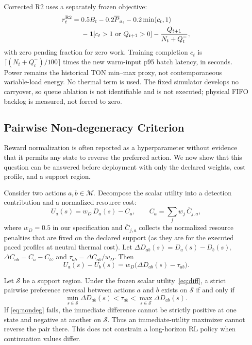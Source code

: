 Corrected R2 uses a separately frozen objective:
\begin{align}\label{eq:r2reward}
r_t^{\rm R2}={}&0.5 B_t-0.2\overline P_{a_t}-0.2\min(c_t,1)\nonumber\\
&-\ind[c_t>1\ \mathrm{or}\ Q_{t+1}>0]-\frac{Q_{t+1}}{N_t+Q_t^-},
\end{align}
with zero pending fraction for zero work. Training completion $c_t$ is $\lceil(N_t+Q_t^-)/100\rceil$ times the new warm-input p95 batch latency, in seconds. Power remains the historical TON min--max proxy, not contemporaneous variable-load energy. No thermal term is used. The fixed simulator develops no carryover, so queue ablation is not identifiable and is not executed; physical FIFO backlog is measured, not forced to zero.

\subsection{Pairwise Non-degeneracy Criterion}
Reward normalization is often reported as a hyperparameter without evidence that it permits any state to reverse the preferred action. We now show that this question can be answered before deployment with only the declared weights, cost profile, and a support region.

Consider two actions $a,b\in\mathcal M$. Decompose the scalar utility into a detection contribution and a normalized resource cost:
\begin{equation}
    U_a(s) = w_D\, D_a(s) - C_a,\qquad C_a=\sum_j w_j\,\overline C_{j,a},
\end{equation}
where $w_D=0.5$ in our specification and $\overline C_{j,a}$ collects the normalized resource penalties that are fixed on the declared support (as they are for the executed paced profiles at neutral thermal cost). Let $\Delta D_{ab}(s)=D_a(s)-D_b(s)$, $\Delta C_{ab}=C_a-C_b$, and $\tau_{ab}=\Delta C_{ab}/w_D$. Then
\begin{equation}\label{eq:diff}
    U_a(s)-U_b(s) = w_D\bigl(\Delta D_{ab}(s)-\tau_{ab}\bigr).
\end{equation}

\begin{theorem}\label{thm:nondeg}
Let $\mathcal S$ be a support region. Under the frozen scalar utility~\eqref{eq:diff}, a strict pairwise preference reversal between actions $a$ and $b$ exists on $\mathcal S$ if and only if
\begin{equation}\label{eq:nondeg}
    \min_{s\in\mathcal S}\Delta D_{ab}(s) < \tau_{ab} < \max_{s\in\mathcal S}\Delta D_{ab}(s).
\end{equation}
If \eqref{eq:nondeg} fails, the immediate difference cannot be strictly positive at one state and negative at another on $\mathcal S$. Thus an immediate-utility maximizer cannot reverse the pair there. This does not constrain a long-horizon RL policy when continuation values differ.
\end{theorem}

